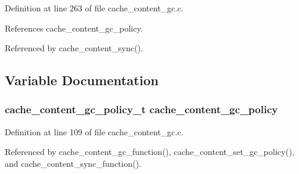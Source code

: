 Definition at line 263 of file cache\_\-content\_\-gc.c.

References cache\_\-content\_\-gc\_\-policy.

Referenced by cache\_\-content\_\-sync().

\subsection{Variable Documentation}
\subsubsection{\setlength{\rightskip}{0pt plus 5cm}cache\_\-content\_\-gc\_\-policy\_\-t {\bf cache\_\-content\_\-gc\_\-policy}}\label{cache__content__gc_8c_a0}




Definition at line 109 of file cache\_\-content\_\-gc.c.

Referenced by cache\_\-content\_\-gc\_\-function(), cache\_\-content\_\-set\_\-gc\_\-policy(), and cache\_\-content\_\-sync\_\-function().